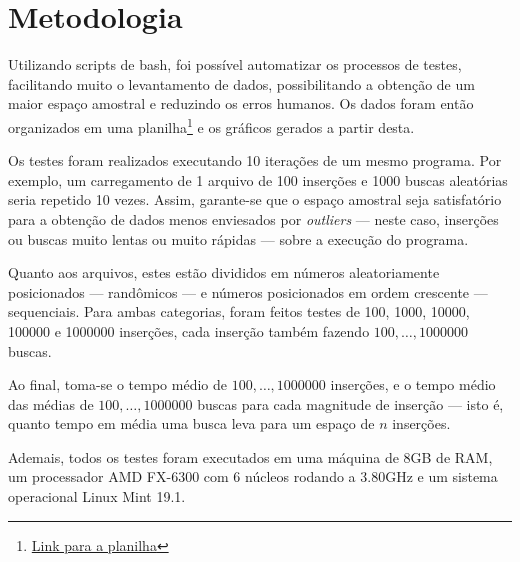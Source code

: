 \chapter{Metodologia}\label{cap-metodologia}

\cite{guarino-et-al:hobook09}
Utilizando scripts de bash, foi possível automatizar os processos de testes, facilitando muito o levantamento de dados, possibilitando a obtenção de um maior espaço amostral e reduzindo os erros humanos.
Os dados foram então organizados em uma planilha\footnote{\hyperlink{https://docs.google.com/spreadsheets/d/1kPc4gESqhumm2cwgiMjTlisKmKfm9pgLG3LPqsUFfPI/edit?usp=sharing}{Link para a planilha}} e os gráficos gerados a partir desta.

Os testes foram realizados executando 10 iterações de um mesmo programa. Por exemplo, um carregamento de 1 arquivo de 100 inserções e 1000 buscas aleatórias seria repetido 10 vezes.
Assim, garante-se que o espaço amostral seja satisfatório para a obtenção de dados menos enviesados por \textit{outliers} --- neste caso, inserções ou buscas muito lentas ou muito rápidas --- sobre a execução do programa.

Quanto aos arquivos, estes estão divididos em números aleatoriamente posicionados --- randômicos --- e números posicionados em ordem crescente --- sequenciais.
Para ambas categorias, foram feitos testes de 100, 1000, 10000, 100000 e 1000000 inserções, cada inserção também fazendo $100, \ldots, 1000000$ buscas.


Ao final, toma-se o tempo médio de $100, \ldots, 1000000$ inserções, e o tempo médio das médias de $100, \ldots, 1000000$ buscas para cada magnitude de inserção --- isto é, quanto tempo em média uma busca leva para um espaço de $n$ inserções.

Ademais, todos os testes foram executados em uma máquina de 8GB de RAM, um processador AMD FX-6300 com 6 núcleos rodando a 3.80GHz e um sistema operacional Linux Mint 19.1.
